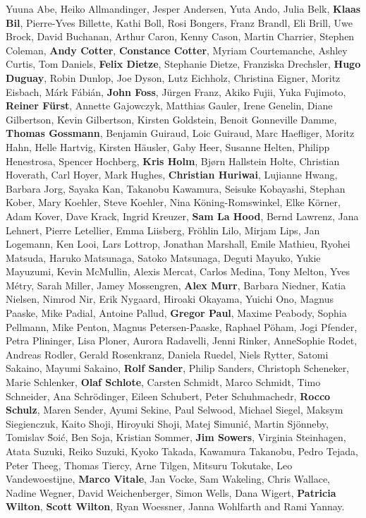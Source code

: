 Yuuna Abe,
Heiko Allmandinger,
Jesper Andersen,
Yuta Ando,
Julia Belk,
\textbf{Klaas Bil},
Pierre-Yves Billette,
Kathi Boll,
Rosi Bongers,
Franz Brandl,
Eli Brill,
Uwe Brock,
David Buchanan,
Arthur Caron,
Kenny Cason,
Martin  Charrier,
Stephen Coleman,
\textbf{Andy Cotter},
\textbf{Constance Cotter},
Myriam Courtemanche,
Ashley  Curtis,
Tom Daniels,
\textbf{Felix Dietze},
Stephanie Dietze,
Franziska Drechsler,
\textbf{Hugo Duguay},
Robin Dunlop,
Joe Dyson,
Lutz Eichholz,
Christina Eigner,
Moritz Eisbach,
M\'{a}rk  F\'{a}bi\'{a}n,
\textbf{John Foss},
J\"{u}rgen  Franz,
Akiko Fujii,
Yuka Fujimoto,
\textbf{Reiner F\"{u}rst},
Annette Gajowczyk,
Matthias Gauler,
Irene Genelin,
Diane Gilbertson,
Kevin Gilbertson,
Kirsten Goldstein,
Benoit Gonneville Damme,
\textbf{Thomas Gossmann},
Benjamin Guiraud,
Loic Guiraud,
Marc Haefliger,
Moritz Hahn,
Helle Hartvig,
Kirsten H\"{a}usler,
Gaby Heer,
Susanne Helten,
Philipp Henestrosa,
Spencer Hochberg,
\textbf{Kris Holm},
Bj{\o}rn Hallstein Holte,
Christian Hoverath,
Carl Hoyer,
Mark Hughes,
\textbf{Christian Huriwai},
Lujianne Hwang,
Barbara Jorg,
Sayaka Kan,
Takanobu Kawamura,
Seisuke Kobayashi,
Stephan Kober,
Mary Koehler,
Steve Koehler,
Nina K\"{o}ning-Romswinkel,
Elke K\"{o}rner,
Adam Kover,
Dave Krack,
Ingrid Kreuzer,
\textbf{Sam La Hood},
Bernd Lawrenz,
Jana Lehnert,
Pierre Letellier,
Emma Liisberg,
Fr\"{o}hlin Lilo,
Mirjam  Lips,
Jan Logemann,
Ken Looi,
Lars Lottrop,
Jonathan Marshall,
Emile Mathieu,
Ryohei Matsuda,
Haruko Matsunaga,
Satoko Matsunaga,
Deguti Mayuko,
Yukie Mayuzumi,
Kevin McMullin,
Alexis  Mercat,
Carlos Medina,
Tony Melton,
Yves M\'{e}try,
Sarah Miller,
Jamey Mossengren,
\textbf{Alex  Murr},
Barbara Niedner,
Katia Nielsen,
Nimrod Nir,
Erik Nygaard,
Hiroaki Okayama,
Yuichi Ono,
Magnus Paaske,
Mike Padial,
Antoine Pallud,
\textbf{Gregor Paul},
Maxime Peabody,
Sophia Pellmann,
Mike Penton,
Magnus Petersen-Paaske,
Raphael P\"{o}ham,
Jogi Pfender,
Petra Plininger,
Lisa Ploner,
Aurora Radavelli,
Jenni Rinker,
AnneSophie Rodet,
Andreas Rodler,
Gerald  Rosenkranz,
Daniela Ruedel,
Niels Rytter,
Satomi Sakaino,
Mayumi Sakaino,
\textbf{Rolf Sander},
Philip  Sanders,
Christoph Scheneker,
Marie Schlenker,
\textbf{Olaf Schlote},
Carsten Schmidt,
Marco Schmidt,
Timo Schneider,
Ana Schr\"{o}dinger,
Eileen Schubert,
Peter Schuhmachedr,
\textbf{Rocco Schulz},
Maren Sender,
Ayumi Sekine,
Paul Selwood,
Michael Siegel,
Maksym  Siegienczuk,
Kaito Shoji,
Hiroyuki Shoji,
Matej \u{S}imuni\'{c},
Martin Sj\"{o}nneby,
Tomislav \u{S}oi\'{c},
Ben Soja,
Kristian Sommer,
\textbf{Jim Sowers},
Virginia Steinhagen,
Atata Suzuki,
Reiko Suzuki,
Kyoko Takada,
Kawamura Takanobu,
Pedro Tejada,
Peter Theeg,
Thomas  Tiercy,
Arne Tilgen,
Mitsuru Tokutake,
Leo Vandewoestijne,
\textbf{Marco Vitale},
Jan Vocke,
Sam Wakeling,
Chris Wallace,
Nadine Wegner,
David Weichenberger,
Simon Wells,
Dana Wigert,
\textbf{Patricia  Wilton},
\textbf{Scott Wilton},
Ryan Woessner,
Janna Wohlfarth
and
Rami Yannay.